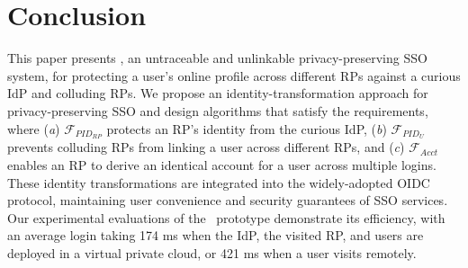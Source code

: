 \section{Conclusion}
\label{sec:conclusion}
This paper presents \usso, an untraceable and unlinkable privacy-preserving SSO system, for protecting a user's online profile across different RPs against a curious IdP and colluding RPs. We propose an identity-transformation approach for privacy-preserving SSO and design algorithms that satisfy the requirements, where (\emph{a}) $\mathcal{F}_{PID_{RP}}$ protects an RP's identity from the curious IdP, (\emph{b}) $\mathcal{F}_{PID_{U}}$ prevents colluding RPs from linking a user across different RPs, and (\emph{c}) $\mathcal{F}_{Acct}$ enables an RP to derive an identical account for a user across multiple logins. These identity transformations are integrated into the widely-adopted OIDC protocol, maintaining user convenience and security guarantees of SSO services. Our experimental evaluations of the \usso\ prototype demonstrate its efficiency, with an average login taking 174 ms when the IdP, the visited RP, and users are deployed in a virtual private cloud, or 421 ms when a user visits remotely.

